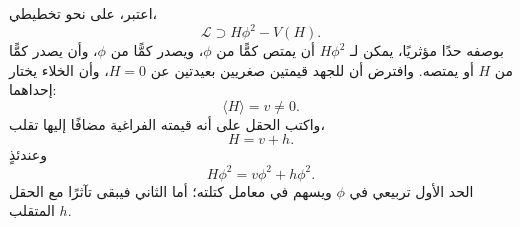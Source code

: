 اعتبر، على نحو تخطيطي،
\begin{equation}
\mathcal L\supset H\phi^2-V(H).
\end{equation}
بوصفه حدًا مؤثريًا، يمكن لـ \(H\phi^2\) أن يمتص كمًّا من \(\phi\)، ويصدر كمًّا من \(\phi\)، وأن يصدر كمًّا من \(H\) أو يمتصه. وافترض أن للجهد قيمتين صغريين بعيدتين عن \(H=0\)، وأن الخلاء يختار إحداهما:
\begin{equation}
\langle H\rangle=v\ne0.
\end{equation}
واكتب الحقل على أنه قيمته الفراغية مضافًا إليها تقلب،
\begin{equation}
H=v+h.
\end{equation}
وعندئذٍ
\begin{equation}
H\phi^2=v\phi^2+h\phi^2.
\end{equation}
الحد الأول تربيعي في \(\phi\) ويسهم في معامل كتلته؛ أما الثاني فيبقى تآثرًا مع الحقل المتقلب \(h\).

\begin{classroomqa}
\end{classroomqa}